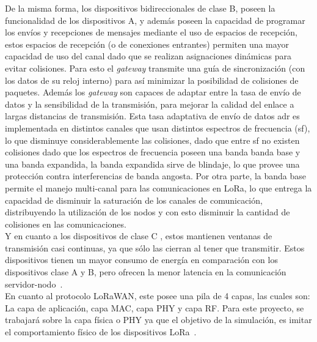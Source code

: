 \begin{justify}
De la misma forma, los dispositivos bidireccionales de clase B, poseen la funcionalidad de los dispositivos A, y además poseen la capacidad de programar los envíos y recepciones de mensajes mediante el uso de espacios de recepción, estos espacios de recepción (o de conexiones entrantes) permiten una mayor capacidad de uso del canal dado que se realizan asignaciones dinámicas para evitar colisiones. Para esto el \textit{gateway} transmite una guía de sincronización (con los datos de su reloj interno) para así minimizar la posibilidad de colisiones de paquetes. Además los \textit{gateway} son capaces de adaptar entre la tasa de envío de datos y la sensibilidad de la transmisión, para mejorar la calidad del enlace a largas distancias de transmisión. Esta tasa adaptativa de envío de datos \gls{adr} es implementada en distintos canales que usan distintos espectros de frecuencia (\gls{sf}), lo que disminuye considerablemente las colisiones, dado que entre \gls{sf} no existen colisiones dado que los espectros de frecuencia poseen una banda banda base y una banda expandida, la banda expandida sirve de blindaje, lo que provee una protección contra interferencias de banda angosta. Por otra parte, la banda base permite el manejo multi-canal para las comunicaciones en LoRa, lo que entrega la capacidad de disminuir la saturación de los canales de comunicación, distribuyendo la utilización de los nodos y con esto disminuir la cantidad de colisiones en las comunicaciones.\\
Y en cuanto a los dispositivos de clase C , estos mantienen ventanas de transmisión casi continuas, ya que sólo las cierran al tener que transmitir. Estos dispositivos tienen un mayor consumo de energía en comparación con los dispositivos clase A y B, pero ofrecen la menor latencia en la comunicación servidor-nodo~\cite{Sornin}.\\
En cuanto al protocolo LoRaWAN, este posee una pila de 4 capas, las cuales son: La capa de aplicación, capa MAC, capa PHY y capa RF. Para este proyecto, se trabajará sobre la capa física o PHY ya que el objetivo de la simulación, es imitar el comportamiento físico de los dispositivos LoRa~\cite{Sornin2}.\\

\end{justify}
